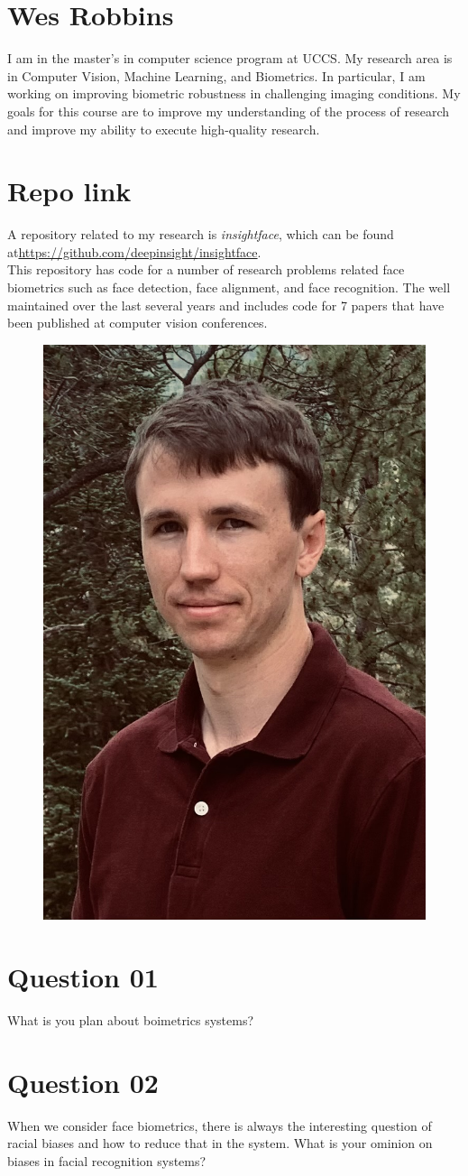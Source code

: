 \section{Wes Robbins}
I am in the master's in computer science program at UCCS. My research area is in Computer Vision, Machine Learning, and Biometrics. In particular, I am working on improving biometric robustness in challenging imaging conditions. My goals for this course are to improve my understanding of the process of research and improve my ability to execute high-quality research. 

\section{Repo link}
A repository related to my research is \textit{insightface},
which can be found at\newline \url{https://github.com/deepinsight/insightface}. \\
This repository has code for a number of research problems related face biometrics such as face detection, face alignment, and face recognition. The well maintained over the last several years and includes code for 7 papers that have been published at computer vision conferences.


\begin{figure}[h]
    \centering
    \includegraphics[width=.25\textwidth]{robbins.jpg}
\end{figure}

\section{Question 01}
What is you plan about boimetrics systems?

\section{Question 02}
When we consider face biometrics, there is always the interesting question of racial biases and how to reduce that in the system. What is your ominion on biases in facial recognition systems?
